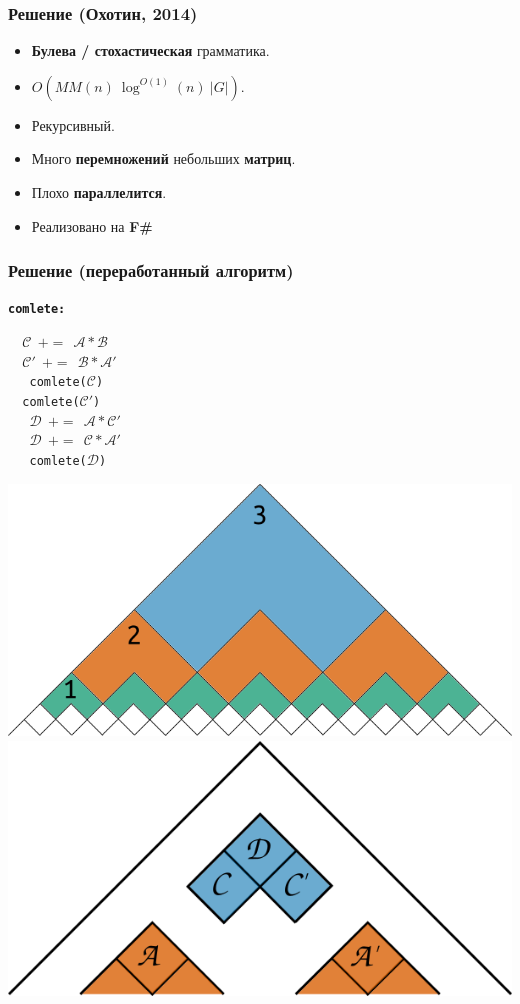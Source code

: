 \documentclass[28pt,pdf,hyperref={unicode}]{beamer}
\renewcommand{\emph}[1]{\textbf{\color{memph}#1}}
\begin{document}
\begin{frame}
\frametitle{Решение (Охотин, 2014)}

\begin{itemize}
\setlength\itemsep{0.5em}
\item {\color{mgreen}\textbf{Булева / стохастическая} грамматика.}
\item {\color{mgreen}$O\left(MM(n)\ \log^{O(1)}(n)\ |G|\right)$.}
\item {\color{mred}Рекурсивный.}
\item {\color{mred}Много \textbf{перемножений} небольших \textbf{матриц}.}
\item {\color{mred}Плохо \textbf{параллелится}.}
\end{itemize}
\vskip20pt
\begin{itemize}
\item Реализовано на \emph{F\#}
\end{itemize}


\end{frame}



\begin{frame}
\frametitle{Решение (переработанный алгоритм)}



\vskip80pt
\emph{\texttt{comlete:}}

\texttt{
  {\color{mblue}\ $\mathcal{C}\ \ +=\ \ \mathcal{A}\ast\mathcal{B}$\\
  \ \ $\mathcal{C'}\ \ +=\ \ \mathcal{B}\ast\mathcal{A'}$\\}
  {\color{mmagenta}\ \ comlete($\mathcal{C}$)\\
  \ \ comlete($\mathcal{C'}$)\\}
  {\color{mblue}\ \ $\mathcal{D}\ \ +=\ \ \mathcal{A}\ast\mathcal{C'}$\\}
  {\color{mmagenta}\ \ $\mathcal{D}\ \ +=\ \ \mathcal{C}\ast\mathcal{A'}$\\}
  {\color{mblue}\ \ comlete($\mathcal{D}$)}
}


\begin{center}
\vskip-205pt
\hfill
\includegraphics[width=.55\textwidth]{pics/drawing4.png}
\vskip20pt
\hfill
\includegraphics[width=.55\textwidth]{pics/drawing5.png}
\end{center}

\end{frame}
\end{document}
